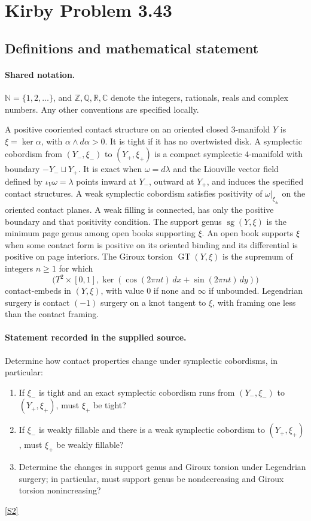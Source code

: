 \documentclass[11pt]{article}
\newcommand{\sref}[2]{\hyperlink{source:#1:#2}{[S#2]}}
\begin{document}
\section{Kirby Problem 3.43}\label{statement}

\subsection{Definitions and mathematical statement}

\paragraph{Shared notation.}$\mathbb N=\{1,2,\ldots\}$, and $\mathbb Z,\mathbb Q,\mathbb R,\mathbb C$ denote the integers, rationals, reals and complex numbers. Any other conventions are specified locally.


A positive cooriented contact structure on an oriented closed $3$-manifold $Y$ is $\xi=\ker\alpha$, with $\alpha\wedge d\alpha>0$. It is tight if it has no overtwisted disk. A symplectic cobordism from $(Y_-,\xi_-)$ to $(Y_+,\xi_+)$ is a compact symplectic $4$-manifold with boundary $-Y_-\sqcup Y_+$. It is exact when $\omega=d\lambda$ and the Liouville vector field defined by $\iota_V\omega=\lambda$ points inward at $Y_-$, outward at $Y_+$, and induces the specified contact structures. A weak symplectic cobordism satisfies positivity of $\omega|_{\xi_\pm}$ on the oriented contact planes. A weak filling is connected, has only the positive boundary and that positivity condition.
The support genus $\operatorname{sg}(Y,\xi)$ is the minimum page genus among open books supporting $\xi$. An open book supports $\xi$ when some contact form is positive on its oriented binding and its differential is positive on page interiors. The Giroux torsion $\operatorname{GT}(Y,\xi)$ is the supremum of integers $n\ge1$ for which
\[
\bigl(T^2\times[0,1],\ker(\cos(2\pi nt)\,dx+\sin(2\pi nt)\,dy)\bigr)
\]
contact-embeds in $(Y,\xi)$, with value $0$ if none and $\infty$ if unbounded. Legendrian surgery is contact $(-1)$ surgery on a knot tangent to $\xi$, with framing one less than the contact framing.
\paragraph{Statement recorded in the supplied source.}
Determine how contact properties change under symplectic cobordisms, in particular:
\begin{enumerate}
\item If $\xi_-$ is tight and an exact symplectic cobordism runs from $(Y_-,\xi_-)$ to $(Y_+,\xi_+)$, must $\xi_+$ be tight?
\item If $\xi_-$ is weakly fillable and there is a weak symplectic cobordism to $(Y_+,\xi_+)$, must $\xi_+$ be weakly fillable?
\item Determine the changes in support genus and Giroux torsion under Legendrian surgery; in particular, must support genus be nondecreasing and Giroux torsion nonincreasing?
\end{enumerate}
\sref{statement}{2}
\end{document}
